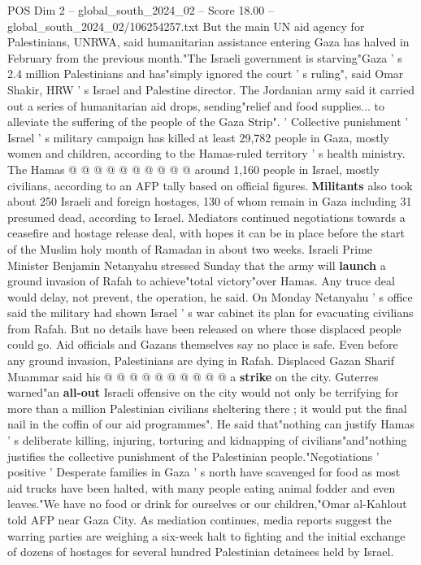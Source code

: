 \begin{textsample}{POS Dim 2 – global\_south\_2024\_02 – Score 18.00 – global\_south\_2024\_02/106254257.txt}
But the main UN aid agency for Palestinians, UNRWA, said humanitarian assistance entering Gaza has halved in February from the previous month."The Israeli government is starving"Gaza ' s 2.4 million Palestinians and has"simply ignored the court ' s ruling", said Omar Shakir, HRW ' s Israel and Palestine director.
The Jordanian army said it carried out a series of humanitarian aid drops, sending"relief and food supplies... to alleviate the suffering of the people of the Gaza Strip". ' Collective punishment ' Israel ' s military campaign has killed at least 29,782 people in Gaza, mostly women and children, according to the Hamas-ruled territory ' s health ministry.
The Hamas @ @ @ @ @ @ @ @ @ @ around 1,160 people in Israel, mostly civilians, according to an AFP tally based on official figures. \textbf{Militants} also took about 250 Israeli and foreign hostages, 130 of whom remain in Gaza including 31 presumed dead, according to Israel.
Mediators continued negotiations towards a ceasefire and hostage release deal, with hopes it can be in place before the start of the Muslim holy month of Ramadan in about two weeks.
Israeli Prime Minister Benjamin Netanyahu stressed Sunday that the army will \textbf{launch} a ground invasion of Rafah to achieve"total victory"over Hamas.
Any truce deal would delay, not prevent, the operation, he said.
On Monday Netanyahu ' s office said the military had shown Israel ' s war cabinet its plan for evacuating civilians from Rafah.
But no details have been released on where those displaced people could go.
Aid officials and Gazans themselves say no place is safe.
Even before any ground invasion, Palestinians are dying in Rafah.
Displaced Gazan Sharif Muammar said his @ @ @ @ @ @ @ @ @ @ a \textbf{strike} on the city.
Guterres warned"an \textbf{all-out} Israeli offensive on the city would not only be terrifying for more than a million Palestinian civilians sheltering there ; it would put the final nail in the coffin of our aid programmes".
He said that"nothing can justify Hamas ' s deliberate killing, injuring, torturing and kidnapping of civilians"and"nothing justifies the collective punishment of the Palestinian people."Negotiations ' positive ' Desperate families in Gaza ' s north have scavenged for food as most aid trucks have been halted, with many people eating animal fodder and even leaves."We have no food or drink for ourselves or our children,"Omar al-Kahlout told AFP near Gaza City.
As mediation continues, media reports suggest the warring parties are weighing a six-week halt to fighting and the initial exchange of dozens of hostages for several hundred Palestinian detainees held by Israel.

\end{textsample}
